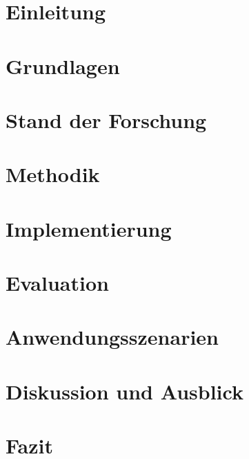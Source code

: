 \mainmatter

\chapter{Einleitung}\label{chap:introduction}


\chapter{Grundlagen}\label{chap:basics}


\chapter{Stand der Forschung}\label{chap:state_of_research}


\chapter{Methodik}\label{chap:methodology}


\chapter{Implementierung}\label{chap:implementation}


\chapter{Evaluation}\label{chap:evaluation}


\chapter{Anwendungsszenarien}\label{chap:application_scenarios}


\chapter{Diskussion und Ausblick}\label{chap:discussion}


\chapter{Fazit}\label{chap:conclusion}

%
